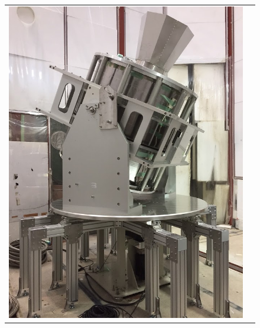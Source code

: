 \begin{figure}[h]
  \begin{tabular}{cc}
    \begin{minipage}[t]{0.3\hsize}
      \centering
      \includegraphics[keepaspectratio, scale=0.2]{2_cosmology/figs/GroundBIRD2.png}
    \end{minipage} 
    \begin{minipage}[t]{0.65\hsize}
      \centering

\end{minipage}
\end{tabular}
\end{figure}

